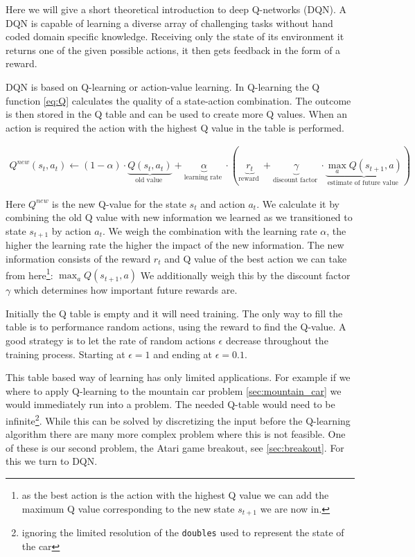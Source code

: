 \label{sec:theory}
Here we will give a short theoretical introduction to deep Q-networks (DQN). A DQN is capable of learning a diverse array of challenging tasks without hand coded domain specific knowledge. Receiving only the state of its environment it returns one of the given possible actions, it then gets feedback in the form of a reward.

DQN is based on Q-learning or action-value learning. In Q-learning the Q function \autoref{eq:Q} calculates the quality of a state-action combination. The outcome is then stored in the Q table and can be used to create more Q values. When an action is required the action with the highest Q value in the table is performed.

\begin{align} \label{eq:Q}
Q^{n e w}\left(s_{t}, a_{t}\right) \leftarrow 
(1-\alpha)\cdot\underbrace{Q\left(s_{t}, a_{t}\right)}_{\text {old value }} 
%
+\underbrace{\alpha}_{\text {learning rate }} \cdot (\underbrace{r_{t}}_{\text {reward }}
+\underbrace{\gamma}_{\text {discount factor }} \cdot \underbrace{\max _{a} Q\left(s_{t+1}, a\right)}_{\text {estimate of future value }})
\end{align}

Here $Q^{new}$ is the new Q-value for the state $s_t$ and action $a_t$. We calculate it by combining the old Q value with new information we learned as we transitioned to state $s_{t+1}$ by action $a_t$. We weigh the combination with the learning rate $\alpha$, the higher the learning rate the higher the impact of the new information. The new information consists of the reward $r_t$ and Q value of the best action we can take from here\footnote{as the best action is the action with the highest Q value we can add the maximum Q value corresponding to the new state $s_{t+1}$ we are now in.}: $\max _{a} Q\left(s_{t+1}, a\right)$ We additionally weigh this by the discount factor $\gamma$ which determines how important future rewards are. 

Initially the Q table is empty and it will need training. The only way to fill the table is to performance random actions, using the reward to find the Q-value. A good strategy is to let the rate of random actions $\epsilon$ decrease throughout the training process. Starting at $\epsilon = 1$ and ending at $\epsilon = 0.1$.

This table based way of learning has only limited applications. For example if we where to apply Q-learning to the mountain car problem \autoref{sec:mountain_car} we would immediately run into a problem. The needed Q-table would need to be infinite\footnote{ignoring the limited resolution of the \texttt{doubles} used to represent the state of the car}. While this can be solved by discretizing the input before the Q-learning algorithm there are many more complex problem where this is not feasible. One of these is our second problem, the Atari game breakout, see \autoref{sec:breakout}. For this we turn to DQN.

